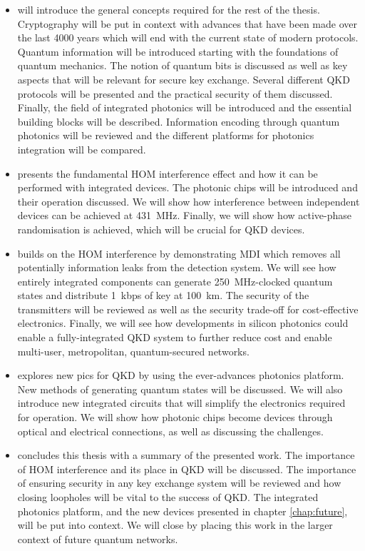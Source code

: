 \begin{itemize}
	\item {} will introduce the general concepts required for the rest of the thesis. Cryptography will be put in context with advances that have been made over the last 4000 years which will end with the current state of modern protocols. Quantum information will be introduced starting with the foundations of quantum mechanics. The notion of quantum bits is discussed as well as key aspects that will be relevant for secure key exchange. Several different \acl{QKD} protocols will be presented and the practical security of them discussed. Finally, the field of integrated photonics will be introduced and the essential building blocks will be described. Information encoding through quantum photonics will be reviewed and the different platforms for photonics integration will be compared.
	\item {} presents the fundamental \ac{HOM} interference effect and how it can be performed with integrated devices. The photonic chips will be introduced and their operation discussed. We will show how interference between independent devices can be achieved at \SI{431}{MHz}. Finally, we will show how active-phase randomisation is achieved, which will be crucial for \ac{QKD} devices. 
	\item {} builds on the \ac{HOM} interference by demonstrating \ac{MDI} which removes all potentially information leaks from the detection system. We will see how entirely integrated components can generate \SI{250}{MHz}-clocked quantum states and distribute \SI{1}{kbps} of key at \SI{100}{km}. The security of the transmitters will be reviewed as well as the security trade-off for cost-effective electronics. Finally, we will see how developments in silicon photonics could enable a fully-integrated \ac{QKD} system to further reduce cost and enable multi-user, metropolitan, quantum-secured networks.
	\item {} explores new \acp{pic} for \ac{QKD} by using the ever-advances photonics platform. New methods of generating quantum states will be discussed. We will also introduce new integrated circuits that will simplify the electronics required for operation. We will show how photonic chips become devices through optical and electrical connections, as well as discussing the challenges. 
	\item {} concludes this thesis with a summary of the presented work. The importance of \ac{HOM} interference and its place in \ac{QKD} will be discussed. The importance of ensuring security in any key exchange system will be reviewed and how closing loopholes will be vital to the success of \ac{QKD}. The integrated photonics platform, and the new devices presented in chapter \ref{chap:future}, will be put into context. We will close by placing this work in the larger context of future quantum networks.
\end{itemize}

